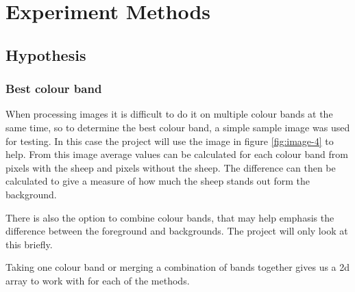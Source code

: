 \chapter{Experiment Methods}
\begin{comment}
This section should discuss the overall hypothesis being tested and justify the approach selected in the context of the research area.  Describe the experiment design that has been selected and how measurements and comparisons of results are to be made. 

You should concentrate on the more important aspects of the method. Present an overview before going into detail. As well as describing the methods adopted, discuss other approaches that were considered. You might also discuss areas that you had to revise after some investigation. 


\end{comment}

\section{Hypothesis}
\begin{comment}
What is a good method to locate the sheep?
Compare how accurate they are.

templating better than thresholding.
\end{comment}

\subsection{Best colour band}
When processing images it is difficult to do it on multiple colour bands at the same time, so to determine the best colour band, a simple sample image was used for testing. In this case the project will use the image in figure \ref{fig:image-4} to help. From this image average values can be calculated for each colour band from pixels with the sheep and pixels without the sheep. The difference can then be calculated to give a measure of how much the sheep stands out form the background.

There is also the option to combine colour bands, that may help emphasis the difference between the foreground and backgrounds. The project will only look at this briefly.

Taking one colour band or merging a combination of bands together gives us a 2d array to work with for each of the methods.

